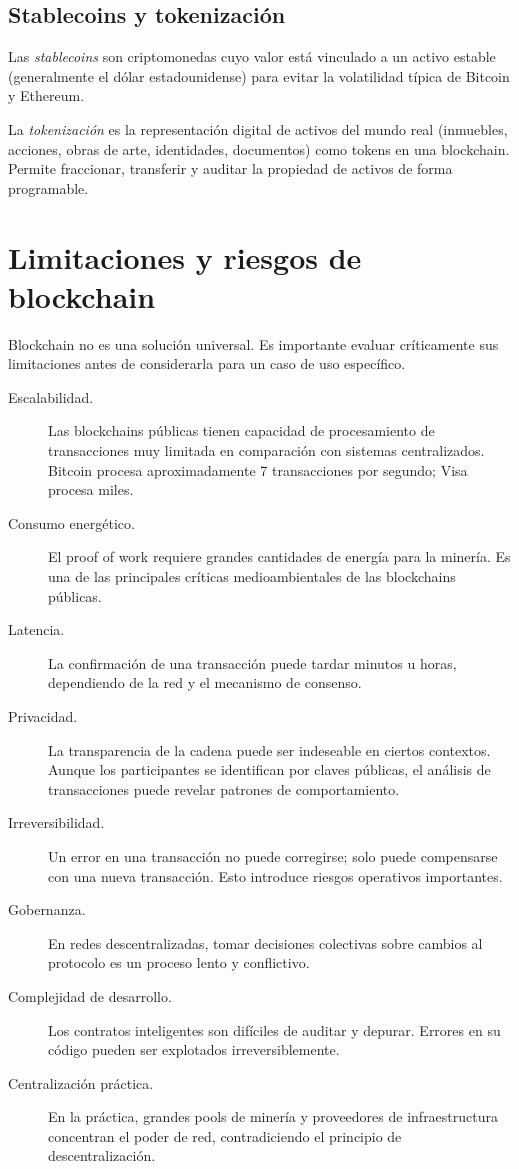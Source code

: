\documentclass[
  coursetitle={Cómputo Nube y Tecnologías Emergentes},
  coursehours={96},
  coursedate={Verano 2026},
  doctype={Notas de clase},
  otherlangs={english,french},
  authorname={Lázaro},
  authorsurname={Bustio-Martínez},
  authortitle={PhD},
  role={Profesor Investigador},
  email={lbustio@inaoe.mx},
  phone={5559504000},
  ext={7459},
  institution={Instituto Nacional de Astrofísica, Óptica y Electrónica (INAOE)},
  department={Maestría en Ciencias en Tecnologías de Seguridad},
  address={Luis Enrique Erro 1, Sta. Ma. Tonantzintla, San Andrés Cholula, CP 72840, Puebla, México},
  margin={0.5in}
]{../../lbustio_lecture_notes}
\begin{document}
\subsection{Stablecoins y tokenización}

Las \textit{stablecoins} son criptomonedas cuyo valor está vinculado a un activo estable (generalmente el dólar estadounidense) para evitar la volatilidad típica de Bitcoin y Ethereum.

La \textit{tokenización} es la representación digital de activos del mundo real (inmuebles, acciones, obras de arte, identidades, documentos) como tokens en una blockchain. Permite fraccionar, transferir y auditar la propiedad de activos de forma programable.

\section{Limitaciones y riesgos de blockchain}

Blockchain no es una solución universal. Es importante evaluar críticamente sus limitaciones antes de considerarla para un caso de uso específico.

\begin{description}
  \item[Escalabilidad.] Las blockchains públicas tienen capacidad de procesamiento de transacciones muy limitada en comparación con sistemas centralizados. Bitcoin procesa aproximadamente 7 transacciones por segundo; Visa procesa miles.
  \item[Consumo energético.] El proof of work requiere grandes cantidades de energía para la minería. Es una de las principales críticas medioambientales de las blockchains públicas.
  \item[Latencia.] La confirmación de una transacción puede tardar minutos u horas, dependiendo de la red y el mecanismo de consenso.
  \item[Privacidad.] La transparencia de la cadena puede ser indeseable en ciertos contextos. Aunque los participantes se identifican por claves públicas, el análisis de transacciones puede revelar patrones de comportamiento.
  \item[Irreversibilidad.] Un error en una transacción no puede corregirse; solo puede compensarse con una nueva transacción. Esto introduce riesgos operativos importantes.
  \item[Gobernanza.] En redes descentralizadas, tomar decisiones colectivas sobre cambios al protocolo es un proceso lento y conflictivo.
  \item[Complejidad de desarrollo.] Los contratos inteligentes son difíciles de auditar y depurar. Errores en su código pueden ser explotados irreversiblemente.
  \item[Centralización práctica.] En la práctica, grandes pools de minería y proveedores de infraestructura concentran el poder de red, contradiciendo el principio de descentralización.
\end{description}
\end{document}
